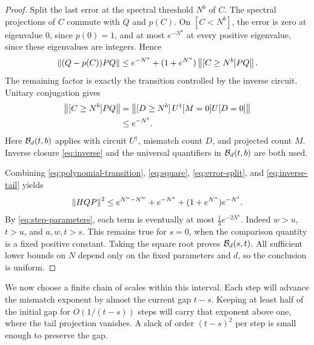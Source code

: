 \begin{proof}
Split the last error at the spectral threshold \(N^b\) of \(C\).
The spectral projections of \(C\) commute with \(Q\) and \(p(C)\).
On \([C<N^b]\), the error is zero at eigenvalue \(0\), since
\(p(0)=1\), and at most \(e^{-N^a}\) at every positive eigenvalue,
since these eigenvalues are integers. Hence
\begin{equation}
\label{eq:error-split}
 \left\lVert (Q-p(C))PQ\right\rVert
 \le e^{-N^a}+(1+e^{N^u})\left\lVert [C\ge N^b]PQ\right\rVert.
\end{equation}
The remaining factor is exactly the transition controlled by the
inverse circuit. Unitary conjugation gives
\begin{align}
 \left\lVert [C\ge N^b]PQ\right\rVert
 &=\left\lVert [D\ge N^b]\,U^\dagger[M=0]U[D=0]\right\rVert\notag\\
 &\le e^{-N^t}.
\label{eq:inverse-tail}
\end{align}
Here \(\mathcal B_d(t,b)\) applies with circuit \(U^\dagger\), mismatch
count \(D\), and projected count \(M\). Inverse closure
\eqref{eq:inverse} and the universal quantifiers in
\(\mathcal B_d(t,b)\) are both used.

Combining \eqref{eq:polynomial-transition}, \eqref{eq:square},
\eqref{eq:error-split}, and \eqref{eq:inverse-tail} yields
\begin{equation}
\label{eq:step-bound}
 \left\lVert HQP\right\rVert^2
 \le e^{N^u-N^w}+e^{-N^a}+(1+e^{N^u})e^{-N^t}.
\end{equation}
By \eqref{eq:step-parameters}, each term is eventually at most
\(\tfrac13e^{-2N^s}\). Indeed \(w>u\), \(t>u\), and
\(a,w,t>s\). This remains true for \(s=0\), when the comparison
quantity is a fixed positive constant. Taking the square root proves
\(\mathcal B_d(s,t)\). All sufficient lower bounds on \(N\) depend only
on the fixed parameters and \(d\), so the conclusion is uniform.
\end{proof}

We now choose a finite chain of scales within this interval. Each step
will advance the mismatch exponent by almost the current gap $t-s$.
Keeping at least half of the initial gap for $O(1/(t-s))$ steps will
carry that exponent above one, where the tail projection vanishes.
A slack of order $(t-s)^2$ per step is small enough to preserve the gap.

